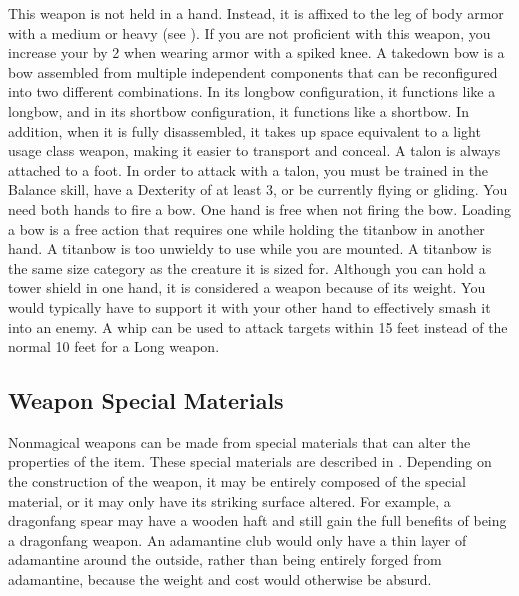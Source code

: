          This weapon is not held in a hand.
        Instead, it is affixed to the leg of body armor with a medium or heavy  (see ).
        If you are not proficient with this weapon, you increase your  by 2 when wearing armor with a spiked knee.
         A takedown bow is a bow assembled from multiple independent components that can be reconfigured into two different combinations.
        In its longbow configuration, it functions like a longbow, and in its shortbow configuration, it functions like a shortbow.
        In addition, when it is fully disassembled, it takes up space equivalent to a light usage class weapon, making it easier to transport and conceal.
         A talon is always attached to a foot.
        In order to attack with a talon, you must be trained in the Balance skill, have a Dexterity of at least 3, or be currently flying or gliding.
         You need both hands to fire a bow. One hand is free when not firing the bow. Loading a bow is a free action that requires one  while holding the titanbow in another hand. A titanbow is too unwieldy to use while you are mounted.
        A titanbow is the same size category as the creature it is sized for.
         Although you can hold a tower shield in one hand, it is considered a  weapon because of its weight.
        You would typically have to support it with your other hand to effectively smash it into an enemy.
         A whip can be used to attack targets within 15 feet instead of the normal 10 feet for a Long weapon.

    \subsection{Weapon Special Materials}\label{Weapon Special Materials}
        Nonmagical weapons can be made from special materials that can alter the properties of the item.
        These special materials are described in .
        Depending on the construction of the weapon, it may be entirely composed of the special material, or it may only have its striking surface altered.
        For example, a dragonfang spear may have a wooden haft and still gain the full benefits of being a dragonfang weapon.
        An adamantine club would only have a thin layer of adamantine around the outside, rather than being entirely forged from adamantine, because the weight and cost would otherwise be absurd.

